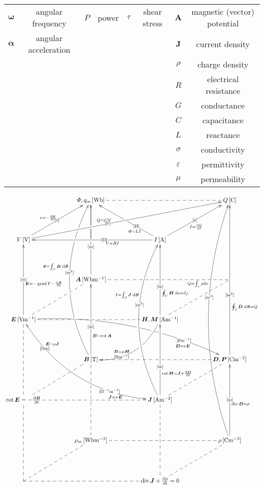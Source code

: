 \documentclass[a4,10pt]{article}
\makeatletter
\def\uni#1{[\!\unit{#1}]}
\def\cell#1#2{#1\,\uni{#2}}
\def\dottedhole#1{\ar@{--}[#1]|!{[ld];[lu]}\hole}
\def\dottedholea#1{\ar@{--}[#1]|!{[ld];[lu]}\hole |!{+(-9.5,-10);+(-9.5,10)}\hole }
\def\dotted#1{\ar@{--}[#1]}
\def\dotteda#1{\ar@{--}[#1] |!{+(11.5,-50);+(11.5,50)}\hole}
\def\arr#1#2#3#4#5{\ar[#1] |-(#2){\uni{#3}} _(#4){#5}}
\def\arruu#1#2#3#4{\arr{uu}{#1}{#2}{#3}{#4}}
\def\arruubefore#1{\arruu{0.4}{m}{0.33}{#1}}
\def\arruubeforemiddlehole{\arruubefore{}|-(0.5)\hole}
\def\arruumiddle#1{\arruu{0.5}{m}{0.45}{#1}}
\def\arrmiddle#1#2#3{\arr{#1}{0.5}{#2}{0.45}{#3}}
\def\arruuuu#1#2#3#4{\arr{uuuu}{#1}{#2}{#3}{#4}}
\def\arruuuubefore#1{\arruuuu{0.4}{m^2}{0.33}{#1}}
\def\arrup#1#2#3#4#5{\ar[#1] |-(#2){\uni{#3}}^(#4){#5}}
\def\arrupbefore#1#2#3{\arrup{#1}{0.4}{#2}{0.4}{#3}}
\def\arrupbeforebeforebefore#1#2#3{\arrup{#1}{0.3}{#2}{0.3}{#3}}
\def\arrupmiddle#1#2#3{\arrup{#1}{0.5}{#2}{0.45}{#3}}
\def\arrupbeforebefore#1#2#3{\arrup{#1}{0.4}{#2}{0.35}{#3}}
\def\arrcv#1#2#3#4#5{\ar@/^3pc/[#1]|-(#2){\uni{#3}}^(#4){#5}}
\def\arrcvafter#1#2#3{\arrcv{#1}{0.6}{#2}{0.65}{#3}}
\def\arrowyyy#1#2#3{\ar@/^3pc/[#1] |-(0.24)\hole |-(0.25){} |-(0.42)\hole|-(.55){\uni{#2}}^(.58){#3}|!{[luuu];[uuur]}\hole  |-(.768)\hole |-(.78){} |-(.836)\hole}
\def\arrowyy#1#2#3#4#5{\ar@/_3pc/@{<->}[#1]|-(0.2){\uni{#4}}^(0.2){#5}|-(.75){\uni{#2}}_(.75){#3}}
\def\arrowz#1#2#3{\ar@/^2pc/[#1] |!{+(-10,-10);+(-10,10)}\hole|-(.7){\uni{#2}}_(.6){#3}}
\def\arrowzz#1#2#3{\ar@/^2pc/[#1] |-(.2)\hole|-(.3)\hole |-(.545)\hole |-(.625)\hole|!{[rr];[rrdd]}\hole |-(.8){\uni{#2}}_(.8){#3\quad}}
\def\B{\bm B}
\def\A{\bm A}
\def\D{\bm D}
\def\E{\bm E}
\def\H{\bm H}
\def\J{\bm J}
\def\S{\bm S}
\def\P{\bm P}
\def\M{\bm M}
\makeatother
\begin{document}
\begin{center}
\begin{tabular}{cc|cc|cc||cc}
    $\bm \omega$&angular frequency&$P$&power&$\tau$&shear stress&$\bm A$&magnetic (vector) potential\\
    $\bm \alpha$&angular acceleration&&&&&$\bm J$&current density\\
    &&&&&&$\rho$&charge density\\
    &&&&&&$R$&electrical resistance\\
    &&&&&&$G$&conductance\\
    &&&&&&$C$&capacitance\\
    &&&&&&$L$&reactance\\
    &&&&&&$\sigma$&conductivity\\
    &&&&&&$\varepsilon$&permittivity\\
    &&&&&&$\mu$&permeability\\
  \end{tabular}





\[\xymatrix@=0.70in{
  & \cell{\varPhi, q_m}{Wb}\dotted{rr}\ar@{-}[d]|!{[ld];[rr]}\hole   &        & \cell{Q}{C}\\
 \cell V V\arrupmiddle{ur}{s}{e=-\fracpd\varPhi t}\arrupbefore{rrru}{F}{Q=CV}      &          & \cell I A\arrupbeforebefore{ll}{O}{V=RI}\arrmiddle{ur}{s}{I=\diff Q t}\arrupbeforebeforebefore{lu}{H}{\varPhi=LI}|-(0.5)\hole        & \\
 & \cell{\A}{Wbm^{-1}} \arruubeforemiddlehole|!{[lu];[ruru]}\hole       & *=0{}       & \dottedholea{ll}\dotted{ld}\\
 \cell{\E}{Vm^{-1}}\arruumiddle{\E=-\grad V-\frac{\partial\bm A}{\partial t}}\dotted{rr} |!{+(20,-10);+(20,10)}\hole |!{+(32.5,-10);+(32.5,10)}\hole \dotted{ru}\arrowzz{rrrd}{Fm^{-1}}{\D=\varepsilon\E}\arrowyy{rrdd}{O^{-1}m^{-1}}{\J=\sigma\E}{Om}{\E=\rho\J } &          & \cell{\H,\M}{Am^{-1}}\arruubefore{\oint_C\H\cdot\dd s=I_f}\arrowz{dl}{Hm^{-1}}{\B=\mu\H}       & \\
 & \cell{\B}{T}\arruubeforemiddlehole_(.3){\bm B=\rot \bm A} \arrowyyy{uuuu}{m^2}{\varPhi=\int_S\B\cdot\dd\S} &        & \cell{\D,\P}{Cm^{-2}}\arruuuubefore{\oint_S\D\cdot\dd\bm{S}=Q}\dottedhole{ll}\dotted{ld}\\
 {\rot\E=-\frac{\partial\B}{\partial t}}\dotted{uu}\dotted{rr}\dotteda{ru}     &          & \cell{\J}{Am^{-2}}\arruubefore{\rot\H=\J +\frac{\partial\D}{\partial t}}\arrcvafter{uuuu}{m^2}{I=\int_S\J\cdot\dd\S}\\
 & \cell{\rho_m}{Wbm^{-3}}\ar@{--}[uu]|!{[u];[u]}\hole |-(.73)\hole      &        & \cell{\rho}{Cm^{-3}}\arruumiddle{\diver\D=\rho}\arrcvafter{uuuuuu}{m^3}{Q=\int_v\rho\dd v}\dottedhole{ll}\dotted{ld}\\
 *=0{} \dotted{uu}\dotted{rr}\dotted{ru}           &          & \diver\J +\frac{\partial\rho}{\partial t}=0\dotted{uu} |!{+(-10,-10);(10,-10)}\hole      & \\
}\]
\end{center}
\end{document}
